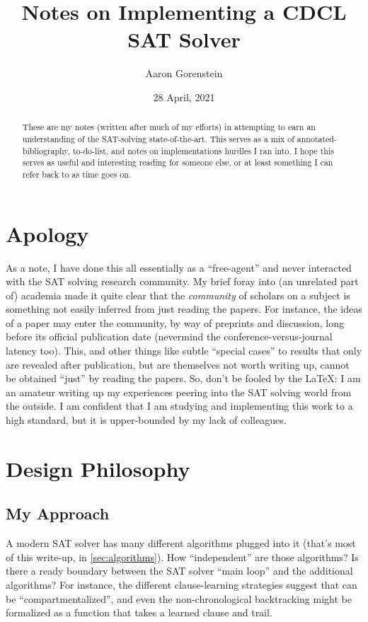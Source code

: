 \documentclass{article}
\title{Notes on Implementing a CDCL SAT Solver}
\author{Aaron Gorenstein}
\date{28 April, 2021}
\begin{document}
\maketitle
\begin{abstract}
    These are my notes (written after much of my efforts) in attempting to earn an understanding of the SAT-solving state-of-the-art.
    This serves as a mix of annotated-bibliography, to-do-list, and notes on implementations hurdles I ran into.
    I hope this serves as useful and interesting reading for someone else, or at least something I can refer back to as time goes on.
\end{abstract}

\section{Apology}
As a note, I have done this all essentially as a ``free-agent'' and never interacted with the SAT solving research community.
My brief foray into (an unrelated part of) academia made it quite clear that the \emph{community} of scholars on a subject is something not easily inferred from just reading the papers.
For instance, the ideas of a paper may enter the community, by way of preprints and discussion, long before its official publication date (nevermind the conference-versus-journal latency too).
This, and other things like subtle ``special cases'' to results that only are revealed after publication, but are themselves not worth writing up, cannot be obtained ``just'' by reading the papers.
So, don't be fooled by the \LaTeX: I am an amateur writing up my experiences peering into the SAT solving world from the outside.
I am confident that I am studying and implementing this work to a high standard, but it is upper-bounded by my lack of colleagues.
\section{Design Philosophy}

\subsection{My Approach}
A modern SAT solver has many different algorithms plugged into it (that's most of this write-up, in \cref{sec:algorithms}).
How ``independent'' are those algorithms?
Is there a ready boundary between the SAT solver ``main loop'' and the additional algorithms?
For instance, the different clause-learning strategies\cite{beamekautzsabharwal2004,fengbacchus2020} suggest that can be ``compartmentalized'',
and even the non-chronological backtracking might be formalized as a function that takes a learned clause and trail.
\end{document}
